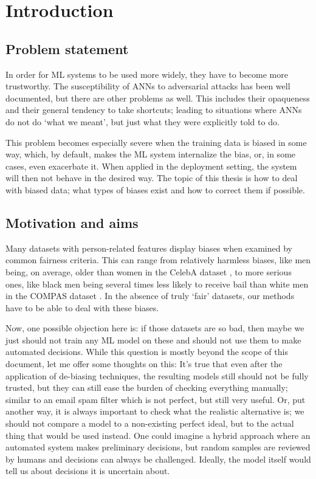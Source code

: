 \chapter{Introduction}\label{ch:introduction}
\section{Problem statement}
In order for \ac{ML} systems to be used more widely,
they have to become more trustworthy.
The susceptibility of \acp{ANN} to adversarial attacks has been well documented, but there are other problems as well.
This includes their opaqueness and their general tendency to take shortcuts;
leading to situations where \acp{ANN} do not do `what we meant', but just what they were explicitly told to do.

This problem becomes especially severe when the training data is biased in some way,
which, by default, makes the \ac{ML} system internalize the bias, or, in some cases, even exacerbate it.
When applied in the deployment setting, the system will then not behave in the desired way.
The topic of this thesis is how to deal with biased data;
what types of biases exist and how to correct them if possible.

\section{Motivation and aims}
Many datasets with person-related features display biases when examined by common fairness criteria.
This can range from relatively harmless biases,
like men being, on average, older than women in the CelebA dataset \citep{liu2015faceattributes},
to more serious ones,
like black men being several times less likely to receive bail than white men in the COMPAS dataset \citep{angwin2016machine}.
In the absence of truly `fair' datasets, our methods have to be able to deal with these biases.

Now, one possible objection here is:
if those datasets are so bad,
then maybe we just should not train any \ac{ML} model on these and should not use them to make automated decisions.
While this question is mostly beyond the scope of this document, let me offer some thoughts on this:
It's true that even after the application of de-biasing techniques,
the resulting models still should not be fully trusted,
but they can still ease the burden of checking everything manually;
similar to an email spam filter which is not perfect, but still very useful.
Or, put another way, it is always important to check what the realistic alternative is;
we should not compare a model to a non-existing perfect ideal, but to the actual thing that would be used instead.
One could imagine a hybrid approach where an automated system makes preliminary decisions,
but random samples are reviewed by humans and decisions can always be challenged.
Ideally, the model itself would tell us about decisions it is uncertain about.

